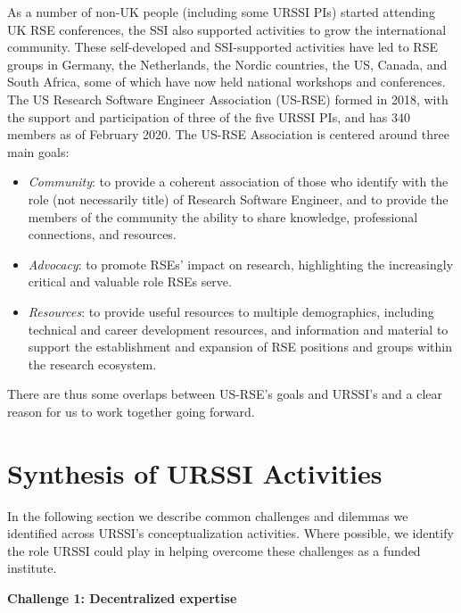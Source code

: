 \documentclass[
]{book}
\begin{document}
As a number of non-UK people (including some URSSI PIs) started attending UK RSE
conferences, the SSI also supported activities to grow the international community.
These self-developed and SSI-supported activities have led to RSE groups in Germany,
the Netherlands, the Nordic countries, the US, Canada, and South Africa, some of
which have now held national workshops and conferences. The US Research Software
Engineer Association (US-RSE) formed in 2018, with the support and participation
of three of the five URSSI PIs, and has 340 members as of February 2020. The US-RSE
Association is centered around three main goals:

\begin{itemize}
\item
  \emph{Community}: to provide a coherent association of those who identify with the role
  (not necessarily title) of Research Software Engineer, and to provide the members
  of the community the ability to share knowledge, professional connections, and resources.
\item
  \emph{Advocacy}: to promote RSEs' impact on research, highlighting the increasingly
  critical and valuable role RSEs serve.
\item
  \emph{Resources}: to provide useful resources to multiple demographics, including technical
  and career development resources, and information and material to support the
  establishment and expansion of RSE positions and groups within the research ecosystem.
\end{itemize}

There are thus some overlaps between US-RSE's goals and URSSI's and a clear reason
for us to work together going forward.

\hypertarget{synthesis-of-urssi-activities}{%
\section{Synthesis of URSSI Activities}\label{synthesis-of-urssi-activities}}

In the following section we describe common challenges and dilemmas we
identified across URSSI's conceptualization activities. Where possible, we identify
the role URSSI could play in helping overcome these challenges as a funded institute.

\textbf{Challenge 1: Decentralized expertise}
\end{document}
